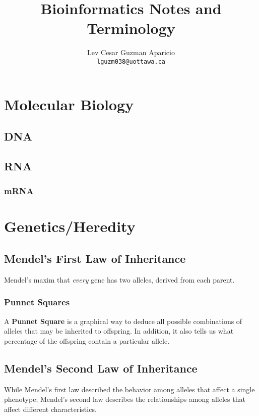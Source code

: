 \documentclass[12pt, lettersize]{article}
\title{Bioinformatics Notes and Terminology}
\author{Lev Cesar Guzman Aparicio \\ \texttt{lguzm038@uottawa.ca}}
\begin{document}
\maketitle

\section{Molecular Biology}

\subsection{DNA}

\subsection{RNA}

\subsubsection{mRNA}

\section{Genetics/Heredity}

\subsection{Mendel's First Law of Inheritance}

Mendel's maxim that \textsl{every} gene has two alleles, derived from each parent. 

\subsubsection{Punnet Squares}

A \textbf{Punnet Square} is a graphical way to deduce all possible combinations of alleles that may be inherited to offspring. In addition, it also tells us what percentage of the offspring contain a particular allele.



\subsection{Mendel's Second Law of Inheritance}

While Mendel's first law described the behavior among alleles that affect a single phenotype; Mendel's second law describes the relationships among alleles that affect different characteristics. \\
\end{document}
